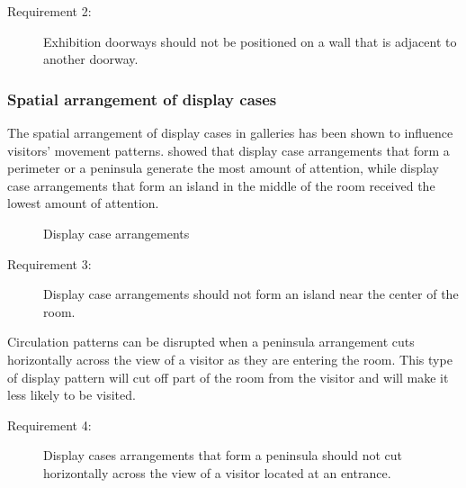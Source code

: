 \documentclass[12pt]{ucthesis}
\begin{document}
\begin{description}
\item[Requirement 2:] Exhibition doorways should not be positioned on a wall that is adjacent to another doorway.
\end{description}


\subsubsection{Spatial arrangement of display cases}
The spatial arrangement of display cases in galleries has been shown to influence visitors' movement patterns. \cite{Bitgood92} showed that display case arrangements that form a perimeter or a peninsula generate the most amount of attention, while display case arrangements that form an island in the middle of the room received the lowest amount of attention.

   \begin{figure}[H]
 \centering
 \hspace{10 mm}
  \hspace{10 mm}
 \caption{Display case arrangements}
\label{display-arrangement}
\end{figure}
 
\begin{description}
\item[Requirement 3:] Display case arrangements should not form an island near the center of the room.
\end{description} 

Circulation patterns can be disrupted when a peninsula arrangement cuts horizontally across the view of a visitor as they are entering the room. This type of display pattern will cut off part of the room from the visitor and will make it less likely to be visited.

\begin{description}
\item[Requirement 4:] Display cases arrangements that form a peninsula should not cut horizontally across the view of a visitor located at an entrance.
\end{description} 

\begin{figure}[H]
\centering
{}
\hspace{10 mm}
\end{figure}
\end{document}
